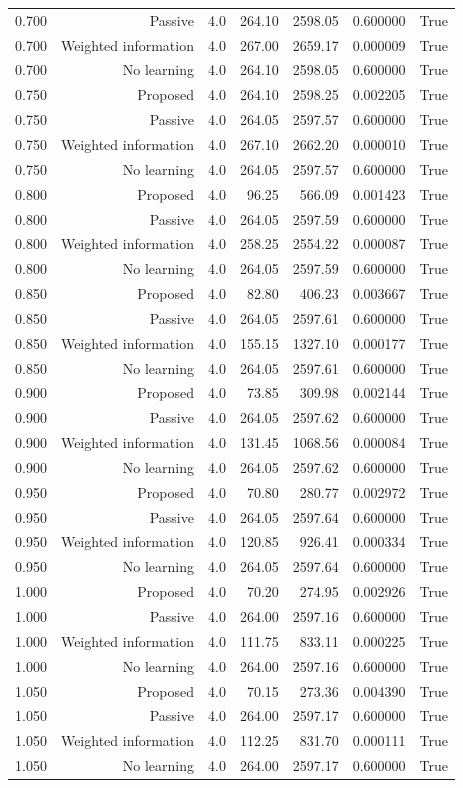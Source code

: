 \begin{longtable}{lrrrrrr}
0.700 & Passive & 4.0 & 264.10 & 2598.05 & 0.600000 & True \\
0.700 & Weighted information & 4.0 & 267.00 & 2659.17 & 0.000009 & True \\
0.700 & No learning & 4.0 & 264.10 & 2598.05 & 0.600000 & True \\
0.750 & Proposed & 4.0 & 264.10 & 2598.25 & 0.002205 & True \\
0.750 & Passive & 4.0 & 264.05 & 2597.57 & 0.600000 & True \\
0.750 & Weighted information & 4.0 & 267.10 & 2662.20 & 0.000010 & True \\
0.750 & No learning & 4.0 & 264.05 & 2597.57 & 0.600000 & True \\
0.800 & Proposed & 4.0 & 96.25 & 566.09 & 0.001423 & True \\
0.800 & Passive & 4.0 & 264.05 & 2597.59 & 0.600000 & True \\
0.800 & Weighted information & 4.0 & 258.25 & 2554.22 & 0.000087 & True \\
0.800 & No learning & 4.0 & 264.05 & 2597.59 & 0.600000 & True \\
0.850 & Proposed & 4.0 & 82.80 & 406.23 & 0.003667 & True \\
0.850 & Passive & 4.0 & 264.05 & 2597.61 & 0.600000 & True \\
0.850 & Weighted information & 4.0 & 155.15 & 1327.10 & 0.000177 & True \\
0.850 & No learning & 4.0 & 264.05 & 2597.61 & 0.600000 & True \\
0.900 & Proposed & 4.0 & 73.85 & 309.98 & 0.002144 & True \\
0.900 & Passive & 4.0 & 264.05 & 2597.62 & 0.600000 & True \\
0.900 & Weighted information & 4.0 & 131.45 & 1068.56 & 0.000084 & True \\
0.900 & No learning & 4.0 & 264.05 & 2597.62 & 0.600000 & True \\
0.950 & Proposed & 4.0 & 70.80 & 280.77 & 0.002972 & True \\
0.950 & Passive & 4.0 & 264.05 & 2597.64 & 0.600000 & True \\
0.950 & Weighted information & 4.0 & 120.85 & 926.41 & 0.000334 & True \\
0.950 & No learning & 4.0 & 264.05 & 2597.64 & 0.600000 & True \\
1.000 & Proposed & 4.0 & 70.20 & 274.95 & 0.002926 & True \\
1.000 & Passive & 4.0 & 264.00 & 2597.16 & 0.600000 & True \\
1.000 & Weighted information & 4.0 & 111.75 & 833.11 & 0.000225 & True \\
1.000 & No learning & 4.0 & 264.00 & 2597.16 & 0.600000 & True \\
1.050 & Proposed & 4.0 & 70.15 & 273.36 & 0.004390 & True \\
1.050 & Passive & 4.0 & 264.00 & 2597.17 & 0.600000 & True \\
1.050 & Weighted information & 4.0 & 112.25 & 831.70 & 0.000111 & True \\
1.050 & No learning & 4.0 & 264.00 & 2597.17 & 0.600000 & True \\
\bottomrule
\end{longtable}
